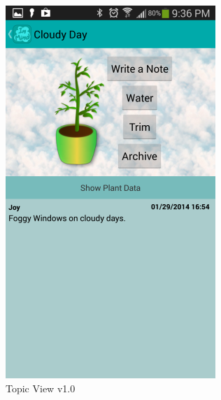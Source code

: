   \begin{figure}
    \caption{\textbf{Evolution of InMind Look and Feel Topic View} --
    On feedback from users, the interface evolved to be more intuitive and attractive.}
    \centering
    \begin{subfigure}[b]{0.4\textwidth}
      \includegraphics[width=\textwidth]{plant_init.png}
       \caption{Topic View v1.0}
    \end{subfigure}
    \begin{subfigure}[b]{0.4\textwidth}

\end{subfigure}
\end{figure}
